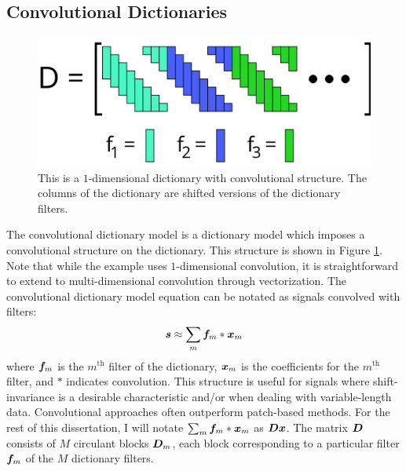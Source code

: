 \subsection{Convolutional Dictionaries}
\begin{figure}
	\includegraphics[width=\textwidth]{figures/convolutionalDictionary.png}
	\caption{This is a $1$-dimensional dictionary with convolutional structure. The columns of the dictionary are shifted versions of the dictionary filters.}
	\label{Figure: Convolutional Dictionary}
\end{figure}
The convolutional dictionary model is a dictionary model which imposes a convolutional structure on the dictionary. This structure is shown in Figure \ref{Figure: Convolutional Dictionary}. Note that while the example uses $1$-dimensional convolution, it is straightforward to extend to multi-dimensional convolution through vectorization. The convolutional dictionary model equation can be notated as signals convolved with filters:
%
\begin{equation}
\bm{s} \approx \sum_m \bm{f}_m * \bm{x}_m
\end{equation}
%
where $\bm{f}_m$ is the $m^{\text{th}}$ filter of the dictionary, $\bm{x}_m$ is the coefficients for the $m^{\text{th}}$ filter, and $*$ indicates convolution. This structure is useful for signals where shift-invariance is a desirable characteristic and/or when dealing with variable-length data. Convolutional approaches often outperform patch-based methods. For the rest of this dissertation, I will notate $\sum_m \bm{f}_m * \bm{x}_m$ as $\bm{D}\bm{x}$. The matrix $\bm{D}$ consists of $M$ circulant blocks $\bm{D}_{m}$, each block corresponding to a particular filter $\bm{f}_m$ of the $M$ dictionary filters.

